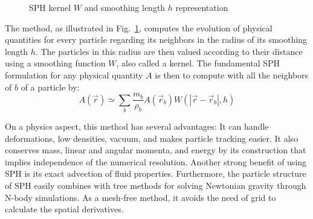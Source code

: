 \begin{figure}
\centering
{}
\caption{SPH kernel $W$ and smoothing length $h$ representation}
\label{fig:sph_base}
\end{figure}

The method, as illustrated in Fig.~\ref{fig:sph_base}, computes the evolution of physical quantities for every particle regarding its neighbors in the radius of its smoothing length $h$. 
The particles in this radius are then valued according to their distance using a smoothing function $W$, also called a kernel. 
The fundamental SPH formulation for any physical quantity $A$ is then to compute with all the neighbors of $b$ of a particle by:
\begin{equation}
A(\vec{r}) \simeq \sum_b \frac{m_b}{\rho_b} A(\vec{r}_b) W ( |\vec{r}-\vec{r}_b|,h)
\end{equation}

On a physics aspect, this method has several advantages:
It can handle deformations, low densities, vacuum, and makes particle tracking easier. 
It also conserves mass, linear and angular momenta, and energy by its construction that implies independence of the numerical resolution. 
Another strong benefit of using SPH is its exact advection of fluid properties. 
Furthermore, the particle structure of SPH easily combines with tree methods for solving Newtonian gravity through N-body simulations.
As a mesh-free method, it avoids the need of grid to calculate the spatial derivatives. 

